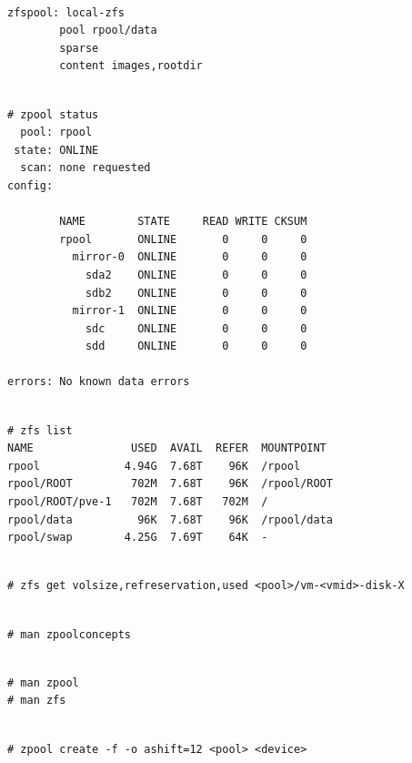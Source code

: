 \begin{lstlisting}

zfspool: local-zfs
        pool rpool/data
        sparse
        content images,rootdir

\end{lstlisting}

\begin{lstlisting}

# zpool status
  pool: rpool
 state: ONLINE
  scan: none requested
config:

        NAME        STATE     READ WRITE CKSUM
        rpool       ONLINE       0     0     0
          mirror-0  ONLINE       0     0     0
            sda2    ONLINE       0     0     0
            sdb2    ONLINE       0     0     0
          mirror-1  ONLINE       0     0     0
            sdc     ONLINE       0     0     0
            sdd     ONLINE       0     0     0

errors: No known data errors

\end{lstlisting}

\begin{lstlisting}

# zfs list
NAME               USED  AVAIL  REFER  MOUNTPOINT
rpool             4.94G  7.68T    96K  /rpool
rpool/ROOT         702M  7.68T    96K  /rpool/ROOT
rpool/ROOT/pve-1   702M  7.68T   702M  /
rpool/data          96K  7.68T    96K  /rpool/data
rpool/swap        4.25G  7.69T    64K  -

\end{lstlisting}

\begin{lstlisting}

# zfs get volsize,refreservation,used <pool>/vm-<vmid>-disk-X

\end{lstlisting}

\begin{lstlisting}

# man zpoolconcepts

\end{lstlisting}

\begin{lstlisting}

# man zpool
# man zfs

\end{lstlisting}

\begin{lstlisting}

# zpool create -f -o ashift=12 <pool> <device>

\end{lstlisting}

